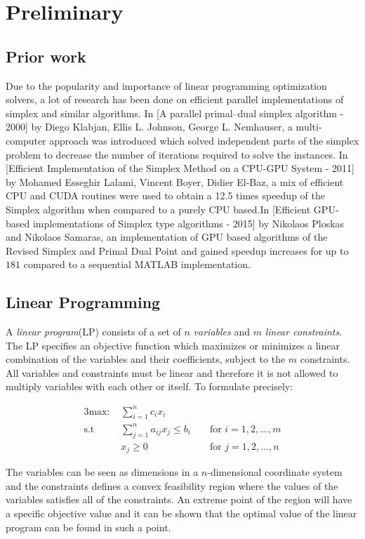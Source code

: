\section{Preliminary}
\subsection{Prior work}
Due to the popularity and importance of linear programming optimization solvers, a lot of research has been done on efficient parallel implementations of simplex and similar algorithms. In [A parallel primal–dual simplex algorithm - 2000] by Diego Klabjan, Ellis L. Johnson, George L. Nemhauser, a multi-computer approach was introduced which solved independent parts of the simplex problem to decrease the number of iterations required to solve the instances. In [Efficient Implementation of the Simplex Method on a CPU-GPU System - 2011] by Mohamed Esseghir Lalami, Vincent Boyer, Didier El-Baz, a mix of efficient CPU and CUDA routines were used to obtain a 12.5 times speedup of the Simplex algorithm when compared to a purely CPU based.In [Efficient GPU-based implementations of Simplex type algorithms - 2015] by Nikolaos Ploskas and Nikolaos Samaras, an implementation of GPU based algorithms of the Revised Simplex and Primal Dual Point and gained speedup increases for up to $181$ compared to a sequential MATLAB implementation.

\subsection{Linear Programming}
A \textit{linear program}(LP) consists of a set of $n$ \textit{variables} and $m$ \textit{linear constraints}. The LP specifies an objective function which maximizes or minimizes a linear combination of the variables and their coefficients, subject to the $m$ constraints. All variables and constraints must be linear and therefore it is not allowed to multiply variables with each other or itself. To formulate precisely:

\begin{alignat*}{3}
\text{max: } &\sum_{i=1}^{n} c_i x_i\\
\text{s.t }  & \sum_{j=1}^{n} a_{ij} x_j \leq b_i && \text{ for } i=1,2,...,m\\
& x_j \geq 0                         && \text{ for } j=1,2,...,n
\end{alignat*}

The variables can be seen as dimensions in a $n$-dimensional coordinate system and the constraints defines a convex feasibility region where the values of the variables satisfies all of the constraints. An extreme point of the region will have a specific objective value and it can be shown that the optimal value of the linear program can be found in such a point.

